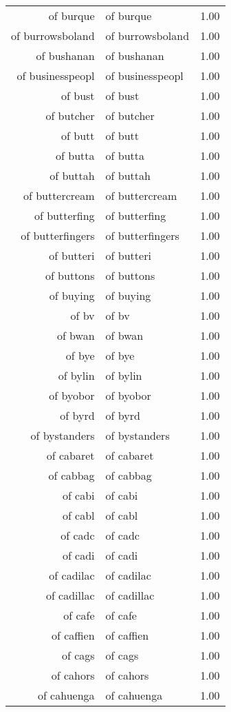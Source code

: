 \begin{table}[ht]
\begin{tabular}{rlr}
  of burque & of burque & 1.00 \\ 
  of burrowsboland & of burrowsboland & 1.00 \\ 
  of bushanan & of bushanan & 1.00 \\ 
  of businesspeopl & of businesspeopl & 1.00 \\ 
  of bust & of bust & 1.00 \\ 
  of butcher & of butcher & 1.00 \\ 
  of butt & of butt & 1.00 \\ 
  of butta & of butta & 1.00 \\ 
  of buttah & of buttah & 1.00 \\ 
  of buttercream & of buttercream & 1.00 \\ 
  of butterfing & of butterfing & 1.00 \\ 
  of butterfingers & of butterfingers & 1.00 \\ 
  of butteri & of butteri & 1.00 \\ 
  of buttons & of buttons & 1.00 \\ 
  of buying & of buying & 1.00 \\ 
  of bv & of bv & 1.00 \\ 
  of bwan & of bwan & 1.00 \\ 
  of bye & of bye & 1.00 \\ 
  of bylin & of bylin & 1.00 \\ 
  of byobor & of byobor & 1.00 \\ 
  of byrd & of byrd & 1.00 \\ 
  of bystanders & of bystanders & 1.00 \\ 
  of cabaret & of cabaret & 1.00 \\ 
  of cabbag & of cabbag & 1.00 \\ 
  of cabi & of cabi & 1.00 \\ 
  of cabl & of cabl & 1.00 \\ 
  of cadc & of cadc & 1.00 \\ 
  of cadi & of cadi & 1.00 \\ 
  of cadilac & of cadilac & 1.00 \\ 
  of cadillac & of cadillac & 1.00 \\ 
  of cafe & of cafe & 1.00 \\ 
  of caffien & of caffien & 1.00 \\ 
  of cags & of cags & 1.00 \\ 
  of cahors & of cahors & 1.00 \\ 
  of cahuenga & of cahuenga & 1.00 \\ 

\end{tabular}
\end{table}
